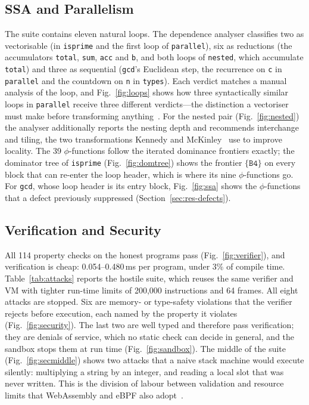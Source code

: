 \documentclass[conference]{IEEEtran}
\newcommand{\code}[1]{\texttt{#1}}
\begin{document}
\subsection{SSA and Parallelism}
The suite contains eleven natural loops. The dependence analyser classifies two as vectorisable (in \code{isprime} and the first loop of \code{parallel}), six as reductions (the accumulators \code{total}, \code{sum}, \code{acc} and \code{b}, and both loops of \code{nested}, which accumulate \code{total}) and three as sequential (\code{gcd}'s Euclidean step, the recurrence on \code{c} in \code{parallel} and the countdown on \code{n} in \code{types}). Each verdict matches a manual analysis of the loop, and Fig.~\ref{fig:loops} shows how three syntactically similar loops in \code{parallel} receive three different verdicts---the distinction a vectoriser must make before transforming anything~\cite{allen2001}. For the nested pair (Fig.~\ref{fig:nested}) the analyser additionally reports the nesting depth and recommends interchange and tiling, the two transformations Kennedy and McKinley~\cite{kennedy1993} use to improve locality. The 39 $\phi$-functions follow the iterated dominance frontiers exactly; the dominator tree of \code{isprime} (Fig.~\ref{fig:domtree}) shows the frontier $\{\code{B4}\}$ on every block that can re-enter the loop header, which is where its nine $\phi$-functions go. For \code{gcd}, whose loop header is its entry block, Fig.~\ref{fig:ssa} shows the $\phi$-functions that a defect previously suppressed (Section~\ref{sec:res-defects}).

\subsection{Verification and Security}
\label{sec:res-security}
All 114 property checks on the honest programs pass (Fig.~\ref{fig:verifier}), and verification is cheap: 0.054--0.480\,ms per program, under 3\% of compile time. Table~\ref{tab:attacks} reports the hostile suite, which reuses the same verifier and VM with tighter run-time limits of 200,000 instructions and 64 frames. All eight attacks are stopped. Six are memory- or type-safety violations that the verifier rejects before execution, each named by the property it violates (Fig.~\ref{fig:security}). The last two are well typed and therefore pass verification; they are denials of service, which no static check can decide in general, and the sandbox stops them at run time (Fig.~\ref{fig:sandbox}). The middle of the suite (Fig.~\ref{fig:secmiddle}) shows two attacks that a naive stack machine would execute silently: multiplying a string by an integer, and reading a local slot that was never written. This is the division of labour between validation and resource limits that WebAssembly and eBPF also adopt~\cite{haas2017,gershuni2019}.
\end{document}
